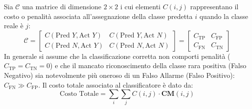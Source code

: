 \begin{definition}
Sia $\mathcal{C}$ una matrice di dimensione $2 \times 2$ i cui elementi $C(i, j)$ rappresentano il costo o penalità associata all'assegnazione della classe predetta $i$ quando la classe reale è $j$:
\begin{equation}
    \mathcal{C} = \begin{bmatrix} C(\text{Pred } Y, \text{Act } Y) & C(\text{Pred } Y, \text{Act } N) \\ C(\text{Pred } N, \text{Act } Y) & C(\text{Pred } N, \text{Act } N) \end{bmatrix} = \begin{bmatrix} C_{\text{TP}} & C_{\text{FP}} \\ C_{\text{FN}} & C_{\text{TN}} \end{bmatrix}
\end{equation}
In generale si assume che la classificazione corretta non comporti penalità ($C_{\text{TP}} = C_{\text{TN}} = 0$) e che il mancato riconoscimento della classe rara positiva (Falso Negativo) sia notevolmente più oneroso di un Falso Allarme (Falso Positivo): $C_{\text{FN}} \gg C_{\text{FP}}$.
Il costo totale associato al classificatore è dato da:
\begin{equation}
    \text{Costo Totale} = \sum_{i} \sum_{j} C(i, j) \cdot \mathbf{CM}(i, j)
\end{equation}
\end{definition}


